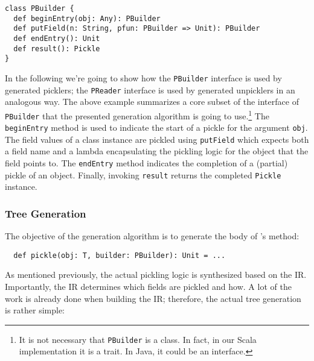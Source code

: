 \begin{lstlisting}
class PBuilder {
  def beginEntry(obj: Any): PBuilder
  def putField(n: String, pfun: PBuilder => Unit): PBuilder
  def endEntry(): Unit
  def result(): Pickle
}
\end{lstlisting}

In the following we're going to show how the \verb|PBuilder| interface is used
by generated picklers; the \verb|PReader| interface is used by generated
unpicklers in an analogous way. The above example summarizes a core
subset of the interface of \verb|PBuilder| that the presented generation
algorithm is going to use.\footnote{It is not necessary that \texttt{PBuilder}
is a class. In fact, in our Scala implementation it is a trait. In Java, it
could be an interface.} The \verb|beginEntry| method is used to indicate the
start of a pickle for the argument \verb|obj|. The field values of a class instance
are pickled using \verb|putField| which expects both a field name and a lambda
encapsulating the pickling logic for the object that the field points to. The
\verb|endEntry| method indicates the completion of a (partial) pickle of an
object. Finally, invoking \verb|result| returns the completed \verb|Pickle|
instance.

\subsubsection{Tree Generation}

The objective of the generation algorithm is to generate the body of
's  method:

\begin{lstlisting}
  def pickle(obj: T, builder: PBuilder): Unit = ...
\end{lstlisting}

As mentioned previously, the actual pickling logic is synthesized based on the
IR. Importantly, the IR determines which fields are pickled and how. A lot of
the work is already done when building the IR; therefore, the actual tree
generation is rather simple:

